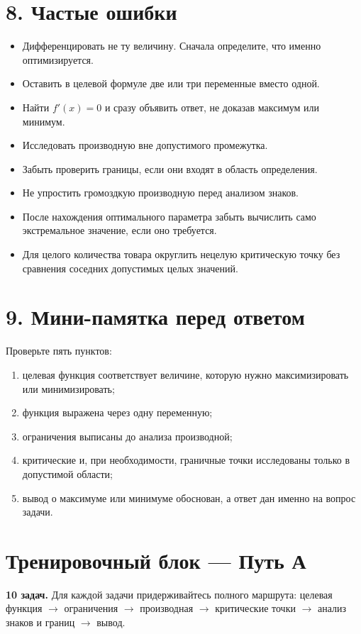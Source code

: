 \documentclass[a4paper,12pt]{article}
\newcommand{\sectionline}{\vspace{1mm}{\color{accent}\hrule height 0.7pt}\vspace{3mm}}
\begin{document}
\section*{8. Частые ошибки}
\sectionline
\begin{itemize}
  \item Дифференцировать не ту величину. Сначала определите, что именно оптимизируется.
  \item Оставить в целевой формуле две или три переменные вместо одной.
  \item Найти $f'(x)=0$ и сразу объявить ответ, не доказав максимум или минимум.
  \item Исследовать производную вне допустимого промежутка.
  \item Забыть проверить границы, если они входят в область определения.
  \item Не упростить громоздкую производную перед анализом знаков.
  \item После нахождения оптимального параметра забыть вычислить само экстремальное значение, если оно требуется.
  \item Для целого количества товара округлить нецелую критическую точку без сравнения соседних допустимых целых значений.
\end{itemize}

\section*{9. Мини-памятка перед ответом}
\sectionline
Проверьте пять пунктов:
\begin{enumerate}
  \item целевая функция соответствует величине, которую нужно максимизировать или минимизировать;
  \item функция выражена через одну переменную;
  \item ограничения выписаны до анализа производной;
  \item критические и, при необходимости, граничные точки исследованы только в допустимой области;
  \item вывод о максимуме или минимуме обоснован, а ответ дан именно на вопрос задачи.
\end{enumerate}

\clearpage
\section*{Тренировочный блок --- Путь А}
\sectionline
\textbf{10 задач.} Для каждой задачи придерживайтесь полного маршрута: целевая функция $\to$ ограничения $\to$ производная $\to$ критические точки $\to$ анализ знаков и границ $\to$ вывод.
\end{document}
